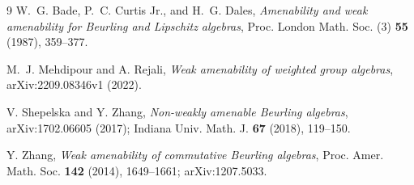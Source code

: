 \documentclass[11pt]{article}
\begin{document}
\begin{thebibliography}{9}
W.~G. Bade, P.~C. Curtis Jr., and H.~G. Dales,
\emph{Amenability and weak amenability for Beurling and Lipschitz algebras},
Proc. London Math. Soc. (3) \textbf{55} (1987), 359--377.

M.~J. Mehdipour and A. Rejali,
\emph{Weak amenability of weighted group algebras},
arXiv:2209.08346v1 (2022).

V. Shepelska and Y. Zhang,
\emph{Non-weakly amenable Beurling algebras},
arXiv:1702.06605 (2017); Indiana Univ. Math. J. \textbf{67} (2018), 119--150.

Y. Zhang,
\emph{Weak amenability of commutative Beurling algebras},
Proc. Amer. Math. Soc. \textbf{142} (2014), 1649--1661;
arXiv:1207.5033.
\end{thebibliography}
\end{document}
